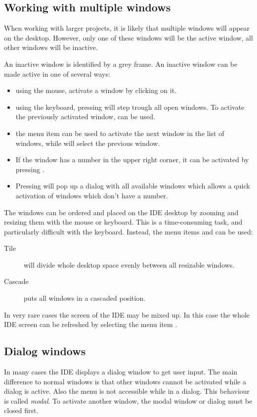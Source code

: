 \subsection{Working with multiple windows}
\label{se:multiplewindows}
When working with larger projects, it is likely that multiple windows 
will appear on the desktop. However, only one of these windows will be 
the active window, all other windows will be inactive.

An inactive window is identified by a grey frame. An inactive window can
be made active in one of several ways:
\begin{itemize}
\item using the mouse, activate a window by clicking on it.
\item using the keyboard, pressing  will step trough all open 
windows. To activate the previously activated window,  can
be used.
\item the menu item  can be used to activate the next 
window in the list of windows, while  will select
the previous window.
\item If the window has a number in the upper right corner, it can be
activated by pressing .
\item Pressing  will pop up a dialog with all 
available windows which allows a quick activation of windows which 
don't have a number.
\end{itemize}

The windows can be ordered and placed on the IDE desktop by zooming and
resizing them with the mouse or keyboard. This is a time-consuming task, 
and particularly difficult with the keyboard. Instead, the menu items
 and  can be used:
\begin{description}
\item[Tile] will divide whole desktop space evenly between all resizable 
windows. 
\item[Cascade] puts all windows in a cascaded position. 
\end{description}

In very rare cases the screen of the IDE may be mixed up. In this
case the whole IDE screen can be refreshed by selecting the menu item 
.
%
%
\subsection{Dialog windows}
\label{se:dialogwindow}
In many cases the IDE displays a dialog window to get user input.
The main difference to normal windows is that other windows cannot be
activated while a dialog is active. Also the menu is not accessible while in
a dialog. This behaviour is called \emph{modal}. To activate another window, 
the modal window or dialog must be closed first.

